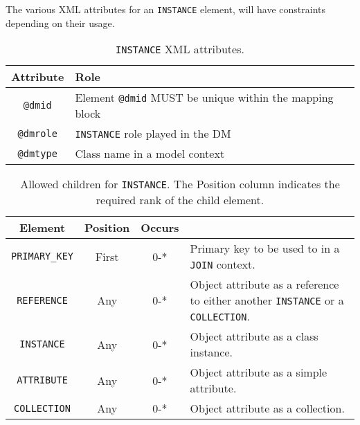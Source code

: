 The various XML attributes for an \texttt{INSTANCE} element, will have constraints depending on their usage.
  
\begin{table}[!htbp]
\small
\centering
\begin{tabulary}{\linewidth}{|c|J|}       
       \hline 
            \textbf{Attribute} & 
            \textbf {Role}\\
       \hline         \hline  
            \texttt{@dmid} & 
            Element  \texttt{@dmid}  MUST be unique within the mapping block  \\
        \hline 
            \texttt{@dmrole} & 
            \texttt{INSTANCE} role played in the DM \\
        \hline 
            \texttt{@dmtype} & 
            Class name in a model context\\
        \hline 
     \end{tabulary}
     \caption{\texttt{INSTANCE} XML attributes.} 
     \label{tbl:instance-att}
 \end{table}   
 


 
\begin{table}[!htbp]
\small
\centering
\begin{tabulary}{\linewidth}{|c |c |c|J|}
    \hline 
        \textbf{Element} &
        \textbf{Position} &
        \textbf{Occurs} &
        \\
    \hline      \hline  
        \texttt{PRIMARY\_KEY}  &        
        First &           
        0-* &
        Primary key to be used to in a \texttt{JOIN} context.\\
    \hline    
        \texttt{REFERENCE}  &        
        Any &           
        0-* &
         Object attribute as a reference to either another \texttt{INSTANCE} or a \texttt{COLLECTION}. \\
    \hline    
        \texttt{INSTANCE} &           
        Any &           
        0-* &
         Object attribute as a class instance. \\
    \hline    
        \texttt{ATTRIBUTE} &           
        Any &           
        0-* &
       Object attribute as a simple attribute. \\
    \hline    
        \texttt{COLLECTION} &           
        Any &           
        0-* &
         Object attribute  as a collection.\\
    \hline 
\end{tabulary}
     \caption{Allowed children for \texttt{INSTANCE}. The Position column indicates the required rank of the child element.} 
     \label{tbl:instance-chilren}
\end{table}
 
